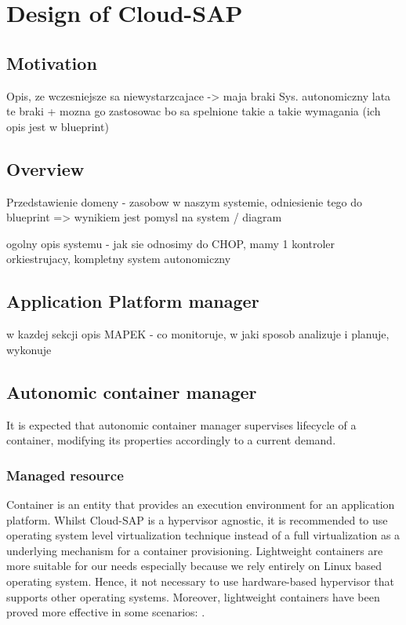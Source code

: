 \chapter{Design of Cloud-SAP}


\section{Motivation}
Opis, ze wczesniejsze sa niewystarzcajace -> maja braki
Sys. autonomiczny lata te braki + mozna go zastosowac bo sa spelnione takie a takie wymagania (ich opis jest w blueprint)

\section{Overview}
Przedstawienie domeny - zasobow w naszym systemie, odniesienie tego do blueprint => wynikiem jest pomysl na system / diagram

ogolny opis systemu - jak sie odnosimy do CHOP, mamy 1 kontroler orkiestrujacy, kompletny system autonomiczny

\section{Application Platform manager}
w kazdej sekcji opis MAPEK - co monitoruje, w jaki sposob analizuje i planuje, wykonuje

\section{Autonomic container manager}
It is expected that autonomic container manager supervises lifecycle of a container, modifying its properties accordingly to a current demand.

\subsection{Managed resource}
Container is an entity that provides an execution environment for an application platform. Whilst Cloud-SAP is a hypervisor agnostic, it is recommended to use operating system level virtualization technique instead of a full virtualization as a underlying mechanism for a container provisioning. Lightweight containers are more suitable for our needs especially because we rely entirely on Linux based operating system. Hence, it not necessary to use hardware-based hypervisor that supports other operating systems. Moreover, lightweight containers have been proved more effective in some scenarios: \cite{RaHiSj13}.

